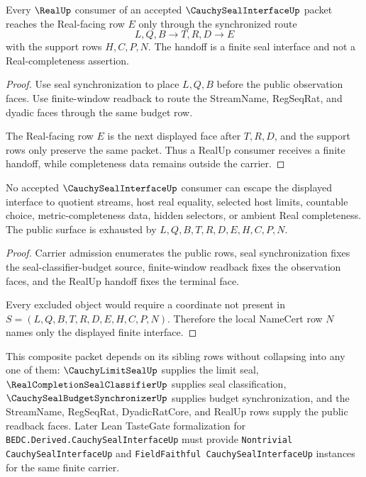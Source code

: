 \begin{theorem}
\label{thm:cauchy-seal-interface-realup-handoff}
Every $\RealUp$ consumer of an accepted $\CauchySealInterfaceUp$ packet reaches the Real-facing row $E$ only through the synchronized route
$$
L,Q,B \to T,R,D \to E
$$
with the support rows $H,C,P,N$. The handoff is a finite seal interface and not a Real-completeness assertion.
\end{theorem}
\begin{proof}
Use seal synchronization to place $L,Q,B$ before the public observation faces. Use finite-window readback to route the StreamName, RegSeqRat, and dyadic faces through the same budget row.

The Real-facing row $E$ is the next displayed face after $T,R,D$, and the support rows only preserve the same packet. Thus a RealUp consumer receives a finite handoff, while completeness data remains outside the carrier.
\end{proof}

\begin{theorem}
\label{thm:cauchy-seal-interface-nochoice-nonquotient-nonescape}
No accepted $\CauchySealInterfaceUp$ consumer can escape the displayed interface to quotient streams, host real equality, selected host limits, countable choice, metric-completeness data, hidden selectors, or ambient Real completeness. The public surface is exhausted by $L,Q,B,T,R,D,E,H,C,P,N$.
\end{theorem}
\begin{proof}
Carrier admission enumerates the public rows, seal synchronization fixes the seal-classifier-budget source, finite-window readback fixes the observation faces, and the RealUp handoff fixes the terminal face.

Every excluded object would require a coordinate not present in $S=(L,Q,B,T,R,D,E,H,C,P,N)$. Therefore the local NameCert row $N$ names only the displayed finite interface.
\end{proof}

This composite packet depends on its sibling rows without collapsing into any one of them: $\CauchyLimitSealUp$ supplies the limit seal, $\RealCompletionSealClassifierUp$ supplies seal classification, $\CauchySealBudgetSynchronizerUp$ supplies budget synchronization, and the StreamName, RegSeqRat, DyadicRatCore, and RealUp rows supply the public readback faces. Later Lean TasteGate formalization for \texttt{BEDC.Derived.CauchySealInterfaceUp} must provide \texttt{Nontrivial CauchySealInterfaceUp} and \texttt{FieldFaithful CauchySealInterfaceUp} instances for the same finite carrier.

